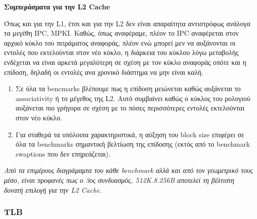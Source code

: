 \begin{center}
    \textbf{Συμπεράσματα για την \textlatin{L2 Cache}}    
\end{center}



Όπως και για την L1, έτσι και για την L2 δεν είναι απαραίτητα αντιστρόφως
ανάλογα τα μεγέθη \textlatin{IPC, MPKI}. Καθώς, όπως αναφέραμε, πλέον το IPC
αναφέρεται στον αρχικό κύκλο του πειράματος αναφοράς, πλέον ενώ μπορεί μεν να
αυξάνονται οι εντολές που εκτελούνται στον νέο κύκλο, η διάρκεια του κύκλου λόγω
μεταβολής ενδέχεται να είναι αρκετά μεγαλύτερη σε σχέση με τον κύκλο αναφοράς
οπότε και η επίδοση, δηλαδή οι εντολές ανα χρονικό διάστημα να μην είναι καλή.

\begin{enumerate}
    \item Σε όλα τα bencmarks βλέπουμε πως η επίδοση μειώνεται καθώς αυξάνεται
        το associativity ή το μέγεθος της L2. Αυτό συμβαίνει καθώς ο κύκλος του
        ρολογιού αυξάνεται πιο γρήγορα σε σχέση με το πόσες περισσότερες εντολές
        εκτελούνται στον νέο κύκλο.
    \item  Για σταθερά τα υπόλοιπα χαρακτηριστικά, η αύξηση του block size
    επιφέρει σε όλα τα benchmarks σημαντική βελτίωση της επίδοσης (εκτός από το benchmark
    swaptions που δεν επηρεάζεται). 
\end{enumerate}

\textit{Από τα επιμέρους διαγράμαμτα του κάθε benchmark αλλά και από τον γεωμετρικό τους μέσο, είναι προφανές πως
ο 3ος συνδυασμός, 512Κ.8.256Β αποτελεί τη βέλτιστη δυνατή επιλογή για την \textlatin{L2 Cache}.}
\vspace{1cm}

\newpage
\subsubsection{TLB}

